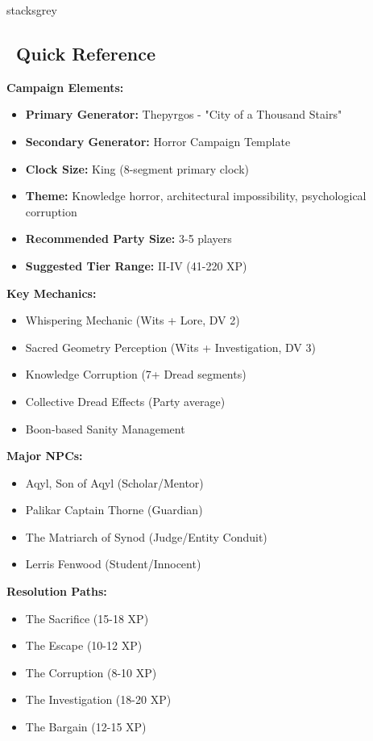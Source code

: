 \documentclass[11pt]{article}
\begin{document}
\begin{campaignsection}{stacksgrey}
\subsection*{\faList\ Quick Reference}

\textbf{Campaign Elements:}
\begin{itemize}
    \item \textbf{Primary Generator:} Thepyrgos - "City of a Thousand Stairs"
    \item \textbf{Secondary Generator:} Horror Campaign Template
    \item \textbf{Clock Size:} King (8-segment primary clock)
    \item \textbf{Theme:} Knowledge horror, architectural impossibility, psychological corruption
    \item \textbf{Recommended Party Size:} 3-5 players
    \item \textbf{Suggested Tier Range:} II-IV (41-220 XP)
\end{itemize}

\textbf{Key Mechanics:}
\begin{itemize}
    \item Whispering Mechanic (Wits + Lore, DV 2)
    \item Sacred Geometry Perception (Wits + Investigation, DV 3)
    \item Knowledge Corruption (7+ Dread segments)
    \item Collective Dread Effects (Party average)
    \item Boon-based Sanity Management
\end{itemize}

\textbf{Major NPCs:}
\begin{itemize}
    \item Aqyl, Son of Aqyl (Scholar/Mentor)
    \item Palikar Captain Thorne (Guardian)
    \item The Matriarch of Synod (Judge/Entity Conduit)
    \item Lerris Fenwood (Student/Innocent)
\end{itemize}

\textbf{Resolution Paths:}
\begin{itemize}
    \item The Sacrifice (15-18 XP)
    \item The Escape (10-12 XP)
    \item The Corruption (8-10 XP)
    \item The Investigation (18-20 XP)
    \item The Bargain (12-15 XP)
\end{itemize}


\end{campaignsection}
\end{document}

